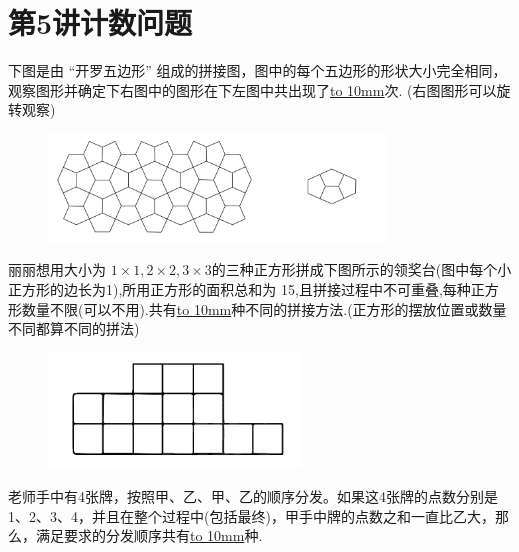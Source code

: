 \section{第5讲\quad 计数问题}

\item {
    下图是由 ``开罗五边形'' 组成的拼接图，图中的每个五边形的形状大小完全相同，观察图形并确定下右图中的图形在下左图中共出现了\underline{\hbox to 10mm{}}次. (右图图形可以旋转观察)
    \begin{figure}[H] 
        \centering
        \includegraphics[width=0.8\textwidth]{./pics/Chapter_6/8.png}
    \end{figure}
}

\item {丽丽想用大小为 $1\times 1, 2\times 2, 3\times 3$的三种正方形拼成下图所示的领奖台(图中每个小正方形的边长为1),所用正方形的面积总和为 15,且拼接过程中不可重叠,每种正方形数量不限(可以不用).共有\underline{\hbox to 10mm{}}种不同的拼接方法.(正方形的摆放位置或数量不同都算不同的拼法)
    \begin{figure}[H] 
        \centering
        \includegraphics[width=0.6\textwidth]{./pics/Chapter_6/9.png}
    \end{figure}
}

\item {老师手中有4张牌，按照甲、乙、甲、乙的顺序分发。如果这4张牌的点数分别是 1、2、3、4，并且在整个过程中(包括最终)，甲手中牌的点数之和一直比乙大，那么，满足要求的分发顺序共有\underline{\hbox to 10mm{}}种.
}

